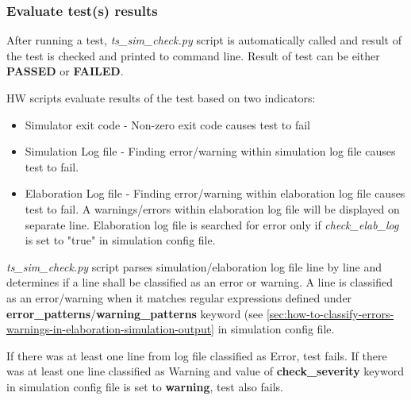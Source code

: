 \documentclass{tropic_design_spec}
\begin{document}
\subsubsection{Evaluate test(s) results}
\label{sec:evaluate-test-results}

After running a test, \textit{ts_sim_check.py} script is automatically called and
result of the test is checked and printed to command line. Result of test can be either
\textbf{PASSED} or \textbf{FAILED}.

HW scripts evaluate results of the test based on two indicators:
\begin{itemize}
    \item Simulator exit code - Non-zero exit code causes test to fail
    \item Simulation Log file - Finding error/warning within simulation log
                                file causes test to fail.
    \item Elaboration Log file - Finding error/warning within elaboration log
                                file causes test to fail. A warnings/errors within elaboration
                                log file will be displayed on separate line. Elaboration log
                                file is searched for error only if \textit{check_elab_log} is set
                                to "true" in simulation config file.
\end{itemize}

\textit{ts_sim_check.py} script parses simulation/elaboration log file line by line and
determines if a line shall be classified as an error or warning. A line is classified
as an error/warning when it matches regular expressions defined under 
\textbf{error_patterns}/\textbf{warning_patterns} keyword (see
\ref{sec:how-to-classify-errors-warnings-in-elaboration-simulation-output} in simulation
config file.

If there was at least one line from log file classified as Error, test fails.
If there was at least one line classified as Warning and value of
\textbf{check_severity} keyword in simulation config file is set to
\textbf{warning}, test also fails.

\end{document}

